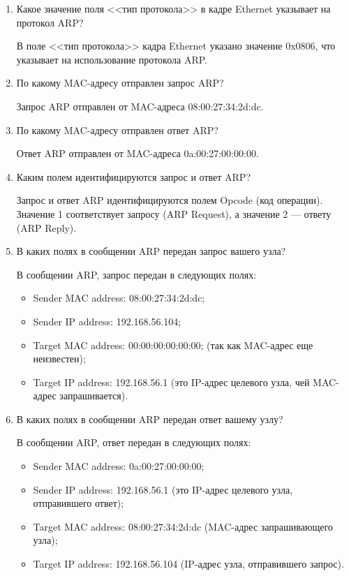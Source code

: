 \begin{enumerate}
	\item Какое значение поля <<тип протокола>>
		в кадре Ethernet указывает на протокол ARP?\par
		В поле <<тип протокола>> кадра Ethernet
		указано значение 0x0806,
		что указывает на использование протокола ARP.
	\item По какому MAC-адресу отправлен запрос ARP?\par
		Запрос ARP отправлен от MAC-адреса 08:00:27:34:2d:dc.
	\item По какому MAC-адресу отправлен ответ ARP?\par
		Ответ ARP отправлен от MAC-адреса 0a:00:27:00:00:00.
	\item Каким полем идентифицируются запрос и ответ ARP?\par
		Запрос и ответ ARP идентифицируются полем Opcode (код операции).
		Значение 1 соответствует запросу (ARP Request),
		а значение 2 --- ответу (ARP Reply).
	\item В каких полях в сообщении ARP передан запрос вашего узла?\par
		В сообщении ARP, запрос передан в следующих полях:
		\begin{itemize}
			\item Sender MAC address: 08:00:27:34:2d:dc;
			\item Sender IP address: 192.168.56.104;
			\item Target MAC address: 00:00:00:00:00:00;
				(так как MAC-адрес еще неизвестен);
			\item Target IP address: 192.168.56.1
				(это IP-адрес целевого узла, чей MAC-адрес запрашивается).
		\end{itemize}
	\item В каких полях в сообщении ARP передан ответ вашему узлу?\par
		В сообщении ARP, ответ передан в следующих полях:
		\begin{itemize}
			\item Sender MAC address: 0a:00:27:00:00:00;
			\item Sender IP address: 192.168.56.1
				(это IP-адрес целевого узла, отправившего ответ);
			\item Target MAC address: 08:00:27:34:2d:dc
				(MAC-адрес запрашивающего узла);
			\item Target IP address: 192.168.56.104
				(IP-адрес узла, отправившего запрос).
		\end{itemize}
\end{enumerate}

